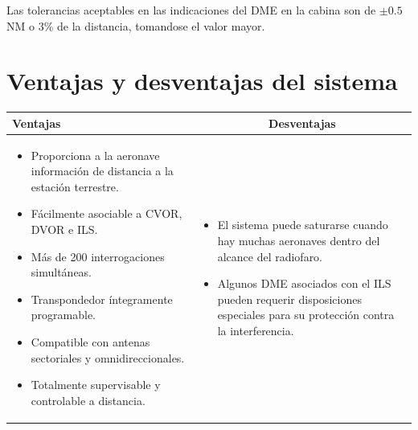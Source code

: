 Las tolerancias aceptables en las indicaciones del DME en la cabina son de $\pm 0.5$\,NM o 3\% de la distancia, tomandose el valor mayor.

\section{Ventajas y desventajas del sistema}
\label{sec:DME.ventajas.y.desventajas}

\begin{tabular}{|m{}|m{}|} \hline
	\centering \textbf{Ventajas} & 
	\multicolumn{1}{c|}{\textbf{Desventajas}} \\ \hline
  \begin{itemize}
  \item Proporciona a la aeronave informaci\'on de distancia a la
    estaci\'on terrestre.
  \item F\'acilmente asociable a CVOR, DVOR e ILS.
  \item M\'as de 200 interrogaciones simult\'aneas.
  \item Transpondedor \'integramente programable.
  \item Compatible con antenas sectoriales y omnidireccionales.
  \item Totalmente supervisable y controlable a distancia.
  \end{itemize}
	&
        \begin{itemize}
        \item El sistema puede saturarse cuando hay muchas aeronaves dentro del alcance del radiofaro. 
        \item 	Algunos DME asociados con el ILS pueden requerir disposiciones especiales para su protecci\'on contra la interferencia. 
        \end{itemize}
        \\ \hline
\end{tabular}





%
%
%
%
%
%
%
%
%
%




